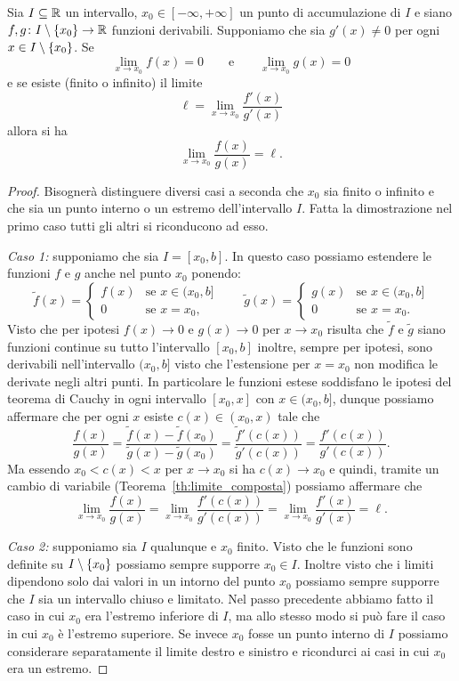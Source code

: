 \begin{theorem}[de l'Hospital $0/0$]
\mymark{***}
Sia $I\subseteq {\mathbb R}$ un intervallo, $x_0\in [-\infty,+\infty]$ un punto di accumulazione
di $I$
e siano $f,g \colon I\setminus{\left\{ x_0 \right\}} \to {\mathbb R}$ funzioni derivabili.
Supponiamo che sia $g'(x)\neq 0$ per ogni $x\in I\setminus{\left\{ x_0 \right\}}$.
Se
\[
  \lim_{x\to x_0} f(x) = 0 \qquad \text{e}\qquad \lim_{x\to x_0} g(x) = 0
\]
e se esiste (finito o infinito) il limite
\[
  \ell = \lim_{x\to x_0}\frac{f'(x)}{g'(x)}
\]
allora si ha
\[
  \lim_{x\to x_0} \frac{f(x)}{g(x)} = \ell.
\]
\end{theorem}
%
\begin{proof}
\mymark{**}
Bisognerà distinguere diversi casi a seconda che $x_0$ sia finito o infinito
e che sia un punto interno o un estremo dell'intervallo $I$.
Fatta la dimostrazione nel primo caso tutti gli altri si riconducono ad esso.

\emph{Caso 1:} supponiamo che sia $I=[x_0, b]$. In questo caso possiamo
estendere le funzioni $f$ e $g$ anche nel punto $x_0$ ponendo:
\[
\tilde f(x) =
\begin{cases}
  f(x) & \text{se $x\in (x_0,b]$}\\
  0 & \text{se $x=x_0$,}
\end{cases}
\qquad
\tilde g(x) =
\begin{cases}
  g(x) & \text{se $x\in (x_0,b]$}\\
  0 & \text{se $x=x_0$.}
\end{cases}
\]
Visto che per ipotesi $f(x) \to 0$ e $g(x)\to 0$ per $x\to x_0$ risulta
che $\tilde f$ e $\tilde g$ siano funzioni continue su tutto l'intervallo $[x_0,b]$
inoltre, sempre per ipotesi, sono derivabili nell'intervallo $(x_0,b]$
visto che l'estensione per $x=x_0$ non modifica le derivate negli altri punti.
In particolare le funzioni estese soddisfano le ipotesi del teorema di Cauchy in
ogni intervallo $[x_0,x]$ con $x\in (x_0,b]$, dunque possiamo affermare
che per ogni $x$ esiste $c(x)\in (x_0,x)$ tale che
\[
  \frac{f(x)}{g(x)}
  = \frac{\tilde f(x) - \tilde f(x_0)}
  {\tilde g(x)- \tilde g(x_0)}
  = \frac{\tilde f'(c(x))}{\tilde g'(c(x))}
  = \frac{f'(c(x))}{g'(c(x))}.
\]
Ma essendo $x_0< c(x) < x$ per $x\to x_0$ si ha $c(x)\to x_0$ e quindi,
tramite un cambio di variabile
(Teorema~\ref{th:limite_composta})
possiamo affermare che
\[
    \lim_{x\to x_0} \frac{f(x)}{g(x)}
  = \lim_{x\to x_0}\frac{f'(c(x))}{g'(c(x))}
  = \lim_{x\to x_0}\frac{f'(x)}{g'(x)} = \ell.
\]

\emph{Caso 2:} supponiamo sia $I$ qualunque e $x_0$ finito.
Visto che le funzioni sono definite su $I\setminus{\left\{ x_0 \right\}}$ possiamo sempre
supporre $x_0\in I$. Inoltre
visto che i limiti dipendono solo dai valori in un intorno del punto $x_0$
possiamo sempre supporre che $I$ sia un intervallo chiuso e limitato.
Nel passo precedente abbiamo fatto il caso in cui $x_0$ era l'estremo
inferiore di $I$, ma allo stesso modo si può fare il caso in cui
$x_0$ è l'estremo superiore. Se invece $x_0$ fosse un punto interno di $I$
possiamo considerare separatamente il limite destro e sinistro e ricondurci
ai casi in cui $x_0$ era un estremo.


\end{proof}
